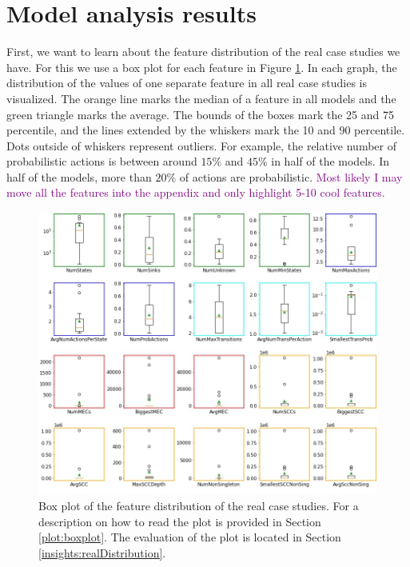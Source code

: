 \section{Model analysis results}
First, we want to learn about the feature distribution of the real case studies we have. 
For this we use a box plot for each feature in Figure \ref{fig:Real_FeatureDistribution}.
In each graph, the distribution of the values of one separate feature in all real case studies is visualized. 
The orange line marks the median of a feature in all models and the green triangle marks the average.
The bounds of the boxes mark the 25 and 75 percentile, and the lines extended by the whiskers mark the 10 and 90 percentile.
Dots outside of whiskers represent outliers.
For example, the relative number of probabilistic actions is between around $15\%$ and $45\%$ in half of the models.
In half of the models, more than $20\%$ of actions are probabilistic.
\textcolor{purple}{Most likely I may move all the features into the appendix and only highlight 5-10 cool features.}
\begin{figure}[h!]
    \centering
    \includegraphics[width=1\textwidth]{figures/Real_FeatureDistribution.jpg}
    \caption[Feature Distribution of the case studies]{
        Box plot of the feature distribution of the real case studies. For a description on how to read the plot is provided in Section \ref{plot:boxplot}.
        The evaluation of the plot is located in Section \ref{insights:realDistribution}.
    }
    \label{fig:Real_FeatureDistribution}
\end{figure}
